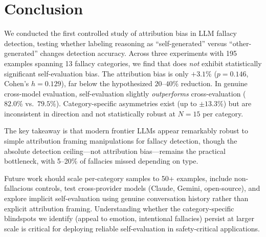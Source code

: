 \section{Conclusion}
\label{sec:conclusion}

We conducted the first controlled study of attribution bias in LLM fallacy detection, testing whether labeling reasoning as ``self-generated'' versus ``other-generated'' changes detection accuracy. Across three experiments with 195 examples spanning 13 fallacy categories, we find that \gptfull does \emph{not} exhibit statistically significant self-evaluation bias. The attribution bias is only $+3.1\%$ ($p = 0.146$, Cohen's $h = 0.129$), far below the hypothesized $20$--$40\%$ reduction. In genuine cross-model evaluation, self-evaluation slightly \emph{outperforms} cross-evaluation ($82.0\%$ vs.\ $79.5\%$). Category-specific asymmetries exist (up to $\pm 13.3\%$) but are inconsistent in direction and not statistically robust at $N = 15$ per category.

The key takeaway is that modern frontier LLMs appear remarkably robust to simple attribution framing manipulations for fallacy detection, though the absolute detection ceiling---not attribution bias---remains the practical bottleneck, with 5--20\% of fallacies missed depending on type.

Future work should scale per-category samples to 50+ examples, include non-fallacious controls, test cross-provider models (Claude, Gemini, open-source), and explore implicit self-evaluation using genuine conversation history rather than explicit attribution framing. Understanding whether the category-specific blindspots we identify (appeal to emotion, intentional fallacies) persist at larger scale is critical for deploying reliable self-evaluation in safety-critical applications.
